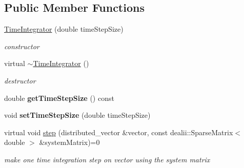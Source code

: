 \subsection*{Public Member Functions}
\begin{DoxyCompactItemize}
\item 
\hypertarget{classnatrium_1_1TimeIntegrator_a4cb6253cff011c15b5518f1a4e9bb33b}{\hyperlink{classnatrium_1_1TimeIntegrator_a4cb6253cff011c15b5518f1a4e9bb33b}{Time\-Integrator} (double time\-Step\-Size)}\label{classnatrium_1_1TimeIntegrator_a4cb6253cff011c15b5518f1a4e9bb33b}

\begin{DoxyCompactList}\small\item\em constructor \end{DoxyCompactList}\item 
\hypertarget{classnatrium_1_1TimeIntegrator_ac4f86a5402bf3185f5ed875065c722f2}{virtual \hyperlink{classnatrium_1_1TimeIntegrator_ac4f86a5402bf3185f5ed875065c722f2}{$\sim$\-Time\-Integrator} ()}\label{classnatrium_1_1TimeIntegrator_ac4f86a5402bf3185f5ed875065c722f2}

\begin{DoxyCompactList}\small\item\em destructor \end{DoxyCompactList}\item 
\hypertarget{classnatrium_1_1TimeIntegrator_abcf2980f310c13c3929a3ea7acd3c034}{double {\bfseries get\-Time\-Step\-Size} () const }\label{classnatrium_1_1TimeIntegrator_abcf2980f310c13c3929a3ea7acd3c034}

\item 
\hypertarget{classnatrium_1_1TimeIntegrator_ac0248c553a0526015d93755c89149476}{void {\bfseries set\-Time\-Step\-Size} (double time\-Step\-Size)}\label{classnatrium_1_1TimeIntegrator_ac0248c553a0526015d93755c89149476}

\item 
\hypertarget{classnatrium_1_1TimeIntegrator_a09ee587a56ffad3afe97871396ce4406}{virtual void \hyperlink{classnatrium_1_1TimeIntegrator_a09ee587a56ffad3afe97871396ce4406}{step} (distributed\-\_\-vector \&vector, const dealii\-::\-Sparse\-Matrix$<$ double $>$ \&system\-Matrix)=0}\label{classnatrium_1_1TimeIntegrator_a09ee587a56ffad3afe97871396ce4406}

\begin{DoxyCompactList}\small\item\em make one time integration step on vector using the system matrix \end{DoxyCompactList}\end{DoxyCompactItemize}


